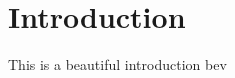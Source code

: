 \section{Introduction}\label{sec:introduction}

This is a beautiful introduction \cite{zhang2025dualbevnavduallayerbevbased} \acrshort{bev}